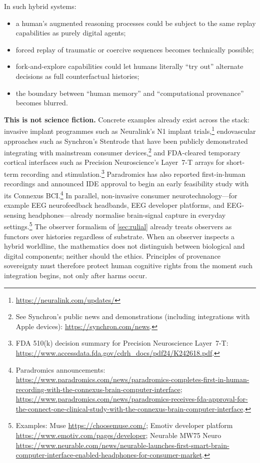 \documentclass{aion}
\begin{document}
In such hybrid systems:
\begin{itemize}[leftmargin=*]
  \item a human's augmented reasoning processes could be subject to
    the same replay capabilities as purely digital agents;
  \item forced replay of traumatic or coercive sequences becomes
    technically possible;
  \item fork-and-explore capabilities could let humans literally
    ``try out'' alternate decisions as full counterfactual histories;
  \item the boundary between ``human memory'' and
    ``computational provenance'' becomes blurred.
\end{itemize}
\noindent\textbf{This is not science fiction.}
Concrete examples already exist across the stack: invasive implant programmes such as Neuralink's N1
implant trials,\footnote{\url{https://neuralink.com/updates/}} endovascular approaches such as
Synchron's Stentrode that have been publicly demonstrated integrating with mainstream consumer
devices,\footnote{See Synchron's public news and demonstrations (including integrations with Apple
devices): \url{https://synchron.com/news}.} and FDA-cleared temporary cortical interfaces such as
Precision Neuroscience's Layer~7-T arrays for short-term recording and stimulation.\footnote{FDA 510(k)
decision summary for Precision Neuroscience Layer~7-T: \url{https://www.accessdata.fda.gov/cdrh_docs/pdf24/K242618.pdf}.}
Paradromics has also reported first-in-human recordings and announced IDE approval to begin an early
feasibility study with its Connexus BCI.\footnote{Paradromics announcements:
\url{https://www.paradromics.com/news/paradromics-completes-first-in-human-recording-with-the-connexus-brain-computer-interface};
\url{https://www.paradromics.com/news/paradromics-receives-fda-approval-for-the-connect-one-clinical-study-with-the-connexus-brain-computer-interface}.}
In parallel, non-invasive consumer neurotechnology---for example EEG neurofeedback headbands, EEG
developer platforms, and EEG-sensing headphones---already normalise brain-signal capture in everyday
settings.\footnote{Examples: Muse \url{https://choosemuse.com/}; Emotiv developer platform
\url{https://www.emotiv.com/pages/developer}; Neurable MW75 Neuro \url{https://www.neurable.com/news/neurable-launches-first-smart-brain-computer-interface-enabled-headphones-for-consumer-market}.}
The observer formalism of \cref{sec:rulial} already treats observers as
functors over histories regardless of substrate.  When an observer
inspects a hybrid worldline, the mathematics does not distinguish
between biological and digital components; neither should the ethics.
Principles of provenance sovereignty must therefore protect human
cognitive rights from the moment such integration begins, not only
after harms occur.
\end{document}
